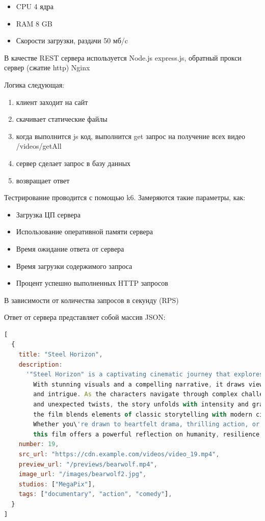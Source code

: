 \documentclass[12pt]{article}
\begin{document}
\begin{itemize}
    \item CPU 4 ядра
    \item RAM 8 GB
    \item Скорости загрузки, раздачи 50 мб/c
\end{itemize}

В качестве REST сервера используется Node.js express.js, обратный прокси сервер (сжатие http) Nginx

Логика следующая:

\begin{enumerate}
    \item клиент заходит на сайт
    \item скачивает статические файлы
    \item когда выполнится js код, выполнится get запрос на получение всех видео /videos/getAll
    \item сервер сделает запрос в базу данных
    \item возвращает ответ
\end{enumerate}

Тестрирование проводится с помощью k6. Замеряются такие параметры, как:

\begin{itemize}
    \item Загрузка ЦП сервера
    \item Использование оперативной памяти сервера
    \item Время ожидание ответа от сервера
    \item Время загрузки содержимого запроса
    \item Процент успешно выполненных HTTP запросов
\end{itemize}

В зависимости от количества запросов в секунду (RPS)

Ответ от сервера представляет собой массив JSON:

\begin{lstlisting}[language=JavaScript]
[
  {
    title: "Steel Horizon",
    description:
      '"Steel Horizon" is a captivating cinematic journey that explores the boundaries of imagination and reality.
        With stunning visuals and a compelling narrative, it draws viewers into a richly woven tale full of emotion, suspense,
        and intrigue. As the characters navigate through complex challenges, deep personal struggles,
        and unexpected twists, the story unfolds with intensity and grace. Crafted by visionary creators,
        the film blends elements of classic storytelling with modern cinematic techniques to create an unforgettable experience.
        Whether you\'re drawn to heartfelt drama, thrilling action, or thought-provoking ideas,
        this film offers a powerful reflection on humanity, resilience, and discovery.',
    number: 19,
    src_url: "https://cdn.example.com/videos/video_19.mp4",
    preview_url: "/previews/bearwolf.mp4",
    image_url: "/images/bearwolf2.jpg",
    studios: ["MegaPix"],
    tags: ["documentary", "action", "comedy"],
  }
]
\end{lstlisting}
\end{document}
